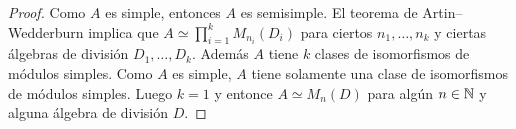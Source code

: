 \begin{proof}
	Como $A$ es simple, entonces $A$ es semisimple. El teorema de Artin--Wedderburn implica que $A\simeq\prod_{i=1}^k M_{n_i}(D_i)$ 
	para ciertos $n_1,\dots,n_k$ y ciertas álgebras de división $D_1,\dots,D_k$. Además $A$ tiene
	$k$ clases de isomorfismos de módulos simples. Como $A$ es simple,
	$A$ tiene solamente una clase de isomorfismos de módulos simples. Luego $k=1$ y entonce
	$A\simeq M_n(D)$ para algún $n\in\mathbb{N}$ y alguna álgebra de división $D$. 
\end{proof}




